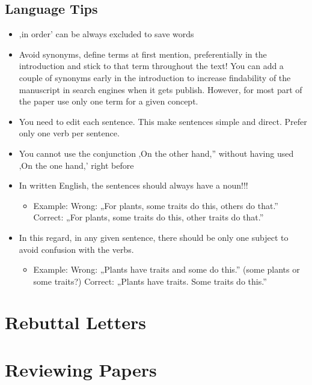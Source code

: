 \documentclass[
]{book}
\providecommand{\tightlist}{%
  \setlength{\itemsep}{0pt}\setlength{\parskip}{0pt}}
\begin{document}
\subsection{Language Tips}\label{language-tips}

\begin{itemize}
\item
  ‚in order' can be always excluded to save words
\item
  Avoid synonyms, define terms at first mention, preferentially in the
  introduction and stick to that term throughout the text! You can add
  a couple of synonyms early in the introduction to increase
  findability of the manuscript in search engines when it gets
  publish. However, for most part of the paper use only one term for a
  given concept.
\item
  You need to edit each sentence. This make sentences simple and
  direct. Prefer only one verb per sentence.
\item
  You cannot use the conjunction ‚On the other hand,'' without having
  used ‚On the one hand,' right before
\item
  In written English, the sentences should always have a noun!!!

  \begin{itemize}
  \tightlist
  \item
    Example: Wrong: „For plants, some traits do this, others do
    that.'' Correct: „For plants, some traits do this, other traits
    do that.''
  \end{itemize}
\item
  In this regard, in any given sentence, there should be only one
  subject to avoid confusion with the verbs.

  \begin{itemize}
  \tightlist
  \item
    Example: Wrong: „Plants have traits and some do this.'' (some
    plants or some traits?) Correct: „Plants have traits. Some
    traits do this.''
  \end{itemize}
\end{itemize}

\section{Rebuttal Letters}\label{rebuttal-letters}

\section{Reviewing Papers}\label{reviewing-papers}
\end{document}
